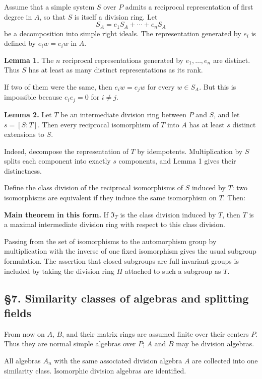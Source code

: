 \documentclass[
  11pt,
]{article}
\begin{document}
Assume that a simple system \(S\) over \(P\) admits a reciprocal
representation of first degree in \(A\), so that \(S\) is itself a
division ring. Let \[
  S_A=e_1S_A+
\cdots+e_nS_A
\] be a decomposition into simple right ideals. The representation
generated by \(e_i\) is defined by \(e_iw=e_iw\) in \(A\).

\textbf{Lemma 1.} The \(n\) reciprocal representations generated by
\(e_1,
\ldots,e_n\) are distinct. Thus \(S\) has at least as many distinct
representations as its rank.

If two of them were the same, then \(e_iw=e_jw\) for every \(w\in S_A\).
But this is impossible because \(e_ie_j=0\) for \(i\ne j\).

\textbf{Lemma 2.} Let \(T\) be an intermediate division ring between
\(P\) and \(S\), and let \(s=[S:T]\). Then every reciprocal isomorphism
of \(T\) into \(A\) has at least \(s\) distinct extensions to \(S\).

Indeed, decompose the representation of \(T\) by idempotents.
Multiplication by \(S\) splits each component into exactly \(s\)
components, and Lemma 1 gives their distinctness.

Define the class division of the reciprocal isomorphisms of \(S\)
induced by \(T\): two isomorphisms are equivalent if they induce the
same isomorphism on \(T\). Then:

\textbf{Main theorem in this form.} If \(\mathfrak I_T\) is the class
division induced by \(T\), then \(T\) is a maximal intermediate division
ring with respect to this class division.

Passing from the set of isomorphisms to the automorphism group by
multiplication with the inverse of one fixed isomorphism gives the usual
subgroup formulation. The assertion that closed subgroups are full
invariant groups is included by taking the division ring \(H\) attached
to such a subgroup as \(T\).

\subsection{§7. Similarity classes of algebras and splitting
fields}\label{similarity-classes-of-algebras-and-splitting-fields}

From now on \(A\), \(B\), and their matrix rings are assumed finite over
their centers \(P\). Thus they are normal simple algebras over \(P\);
\(A\) and \(B\) may be division algebras.

All algebras \(A_n\) with the same associated division algebra \(A\) are
collected into one similarity class. Isomorphic division algebras are
identified.
\end{document}
